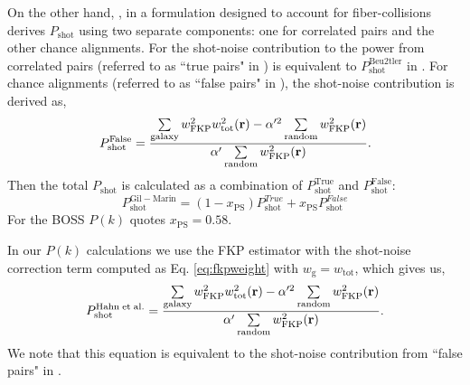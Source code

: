 \documentclass{emulateapj}
\begin{document}
On the other hand, \cite{Gil-Marin:2014aa}, in a formulation designed to account for fiber-collisions derives $P_\mathrm{shot}$ using two separate components: one for correlated pairs and the other chance alignments. For the shot-noise contribution to the power from correlated pairs (referred to as ``true pairs" in \citealt{Gil-Marin:2014aa}) is equivalent to $P^\mathrm{Beu2tler}_\mathrm{shot}$ in \cite{Beutler:2014aa}. For chance alignments (referred to as ``false pairs" in \citealt{Gil-Marin:2014aa}), the shot-noise contribution is derived as, 
\begin{equation}
P^\mathrm{False}_\mathrm{shot} = \frac{\sum\limits_{\mathrm{galaxy}} w^2_\mathrm{FKP}w^2_\mathrm{tot}({\bf r}) - \alpha'^2 \sum\limits_{\mathrm{random}} w_\mathrm{FKP}^2({\bf r})}{\alpha' \sum\limits_{\mathrm{random}}w_\mathrm{FKP}^2({\bf r})}.
\end{equation}
Then the total $P_\mathrm{shot}$ is calculated as a combination of $P^\mathrm{True}_\mathrm{shot}$ and $P^\mathrm{False}_\mathrm{shot}$: 
\begin{equation}
P^\mathrm{Gil-Marin}_\mathrm{shot} = (1- x_\mathrm{PS}) P^{True}_\mathrm{shot} + x_\mathrm{PS} P^{False}_\mathrm{shot}
\end{equation}
For the BOSS $P(k)$ \cite{Gil-Marin:2014aa} quotes $x_\mathrm{PS} = 0.58$. %

In our $P(k)$ calculations we use the FKP estimator with the shot-noise correction term computed as Eq. \ref{eq:fkpweight} with $w_\mathrm{g} = w_\mathrm{tot}$, which gives us, 
\begin{equation} \label{eq:ourshot}
P^\mathrm{Hahn\;et\;al.}_\mathrm{shot} = \frac{\sum\limits_{\mathrm{galaxy}} w^2_\mathrm{FKP}w^2_\mathrm{tot}({\bf r}) - \alpha'^2 \sum\limits_{\mathrm{random}} w_\mathrm{FKP}^2({\bf r})}{\alpha' \sum\limits_{\mathrm{random}}w_\mathrm{FKP}^2({\bf r})}.
\end{equation}
We note that this equation is equivalent to the shot-noise contribution from ``false pairs" in \cite{Gil-Marin:2014aa}. 
\end{document}
